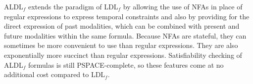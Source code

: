 \documentclass{lmcs}
\theoremstyle{definition}
\DeclareMathOperator{\?}{?}
\begin{document}
ALDL$_f$ extends the paradigm of LDL$_f$ by allowing the use of NFAs in place of regular expressions to express temporal constraints and also by providing for the direct expression of past modalities, which can be combined with present and future modalities within the same formula. Because NFAs are stateful, they can sometimes be more convenient to use than regular expressions. They are also exponentially more succinct than regular expressions. Satisfiability checking of ALDL$_f$ formulas is still PSPACE-complete, so these features come at no additional cost compared to LDL$_f$.



\end{document}
